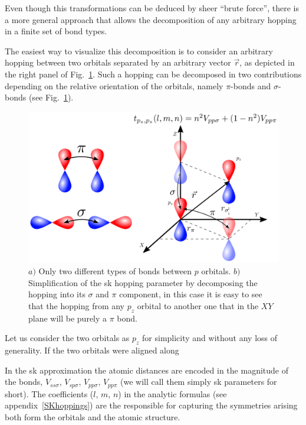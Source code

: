 Even though  this transformations can be deduced by sheer ``brute force'', there is a more general approach that allows the decomposition of any arbitrary hopping in a finite set of bond types.

The easiest way to visualize this decomposition is to consider an arbitrary hopping between two orbitals separated by an arbitrary vector $\vec{r}$, as depicted in the right panel of Fig.~\ref{bonds}. %
Such a hopping can be decomposed in two contributions depending on the relative orientation of the orbitals, namely $\pi$-bonds and $\sigma$-bonds (see Fig.~\ref{bonds}).
\begin{figure}[h!]
\centering
\includegraphics{chapter04/figures/bonds.png}
\vspace{-5pt}
\caption{$a)$ Only two different types of bonds between $p$ orbitals. $b)$ Simplification of the \ac{sk} hopping parameter by decomposing the hopping into its $\sigma$ and $\pi$ component, in this case it is easy to see that the hopping from any $p_{z}$ orbital to another one that in the $XY$ plane will be purely a $\pi$ bond.}
\label{bonds}
\end{figure}
\FloatBarrier
Let us consider the two orbitals as $p_z$ for simplicity and without any loss of generality. If the two orbitals were aligned along



In the \ac{sk} approximation the atomic distances are encoded in the magnitude of the bonds, $V_{ss\sigma}$, $V_{sp\sigma}$, $V_{pp\sigma}$, $V_{pp\pi}$ (we will call them simply \ac{sk} parameters for short). The coefficients ($l$, $m$, $n$) in the analytic formulas (see appendix~\ref{SKhoppings}) are the responsible for capturing the symmetries arising both form the orbitals and the atomic structure.\\

